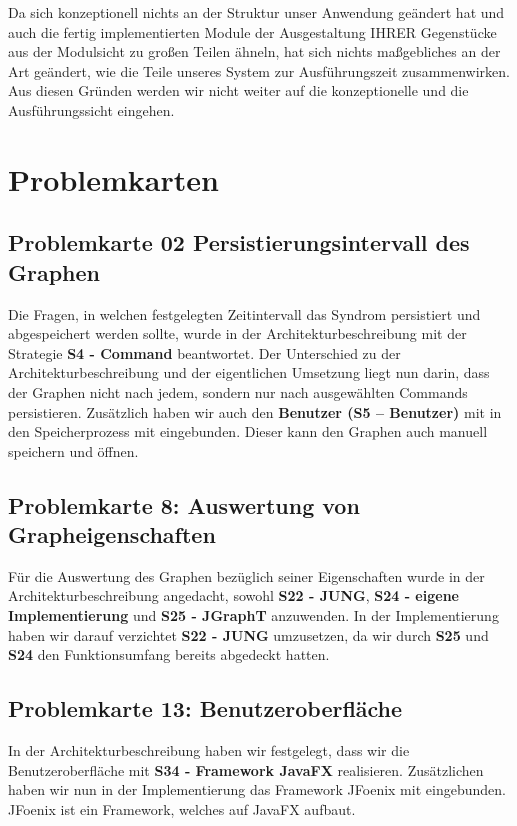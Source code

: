 \documentclass[enabledeprecatedfontcommands,fontsize=11pt,paper=a4,twoside]{scrartcl}
\newcounter{one}
\newcounter{two}[one]
\begin{document}
Da sich konzeptionell nichts an der Struktur unser Anwendung geändert hat und auch die fertig implementierten Module der Ausgestaltung IHRER Gegenstücke aus der Modulsicht zu großen Teilen ähneln, hat sich nichts maßgebliches an der Art geändert, wie die Teile unseres System zur Ausführungszeit zusammenwirken. Aus diesen Gründen werden wir nicht weiter auf die konzeptionelle und die Ausführungssicht eingehen. \\
\newpage

\section{Problemkarten}
\subsection{Problemkarte 02 Persistierungsintervall des Graphen}
Die Fragen, in welchen festgelegten Zeitintervall das Syndrom persistiert und abgespeichert werden sollte, wurde in der Architekturbeschreibung mit der Strategie \textbf{S4 - Command} beantwortet. Der Unterschied zu der Architekturbeschreibung und der eigentlichen Umsetzung liegt nun darin, dass der Graphen nicht nach jedem, sondern nur nach ausgewählten Commands persistieren. Zusätzlich haben wir auch den \textbf{Benutzer (S5 – Benutzer)} mit in den Speicherprozess mit eingebunden. Dieser kann den Graphen auch manuell speichern und öffnen. \\

\subsection{Problemkarte 8: Auswertung von Grapheigenschaften}
Für die Auswertung des Graphen bezüglich seiner Eigenschaften wurde in der Architekturbeschreibung angedacht, sowohl \textbf{S22 - JUNG}, \textbf{S24 - eigene Implementierung} und \textbf{S25 - JGraphT} anzuwenden. In der Implementierung haben wir darauf verzichtet \textbf{S22 - JUNG} umzusetzen, da wir durch \textbf{S25} und \textbf{S24} den Funktionsumfang bereits abgedeckt hatten. \\

\subsection{Problemkarte 13: Benutzeroberfläche}
In der Architekturbeschreibung haben wir festgelegt, dass wir die Benutzeroberfläche mit \textbf{S34 - Framework JavaFX} realisieren. Zusätzlichen haben wir nun in der Implementierung das Framework JFoenix mit eingebunden. JFoenix ist ein Framework, welches auf JavaFX aufbaut. \\
\end{document}
